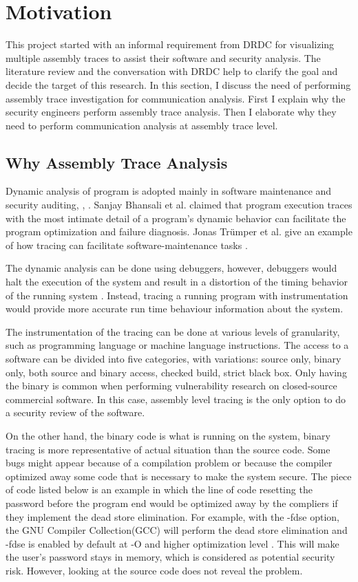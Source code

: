 \section{Motivation}
This project started with an informal requirement from DRDC for visualizing multiple assembly traces to assist their software and security analysis. The literature review and the conversation with DRDC help to clarify the goal and decide the target of this research. In this section, I discuss the need of performing assembly trace investigation for communication analysis. First I explain why the security engineers perform assembly trace analysis. Then I elaborate why they need to perform communication analysis at assembly trace level. 

\subsection{Why Assembly Trace Analysis}
Dynamic analysis of program is adopted mainly in software maintenance and security auditing\cite{zhang2010detecting}, \cite{cai2016sworddta}, \cite{somorovsky2016systematic}. Sanjay Bhansali et al. claimed that program execution traces with the most intimate detail of a program's dynamic behavior can facilitate the program optimization and failure diagnosis. Jonas Tr{\"u}mper et al. give an example of how tracing can facilitate software-maintenance tasks \cite{trumper2012maintenance}.

The dynamic analysis can be done using debuggers, however, debuggers would halt the execution of the system and result in a distortion of the timing behavior of the running system \cite{trumper2012maintenance}. Instead, tracing a running program with instrumentation would provide more accurate run time behaviour information about the system. 

The instrumentation of the tracing can be done at various levels of granularity, such as programming language or machine language instructions. The access to a software can be divided into five categories, with variations: source only, binary only, both source and binary access, checked build, strict black box. Only having the binary is common when performing vulnerability research on closed-source commercial software\cite{dowd_art_2006}. In this case, assembly level tracing is the only option to do a security review of the software.

On the other hand, the binary code is what is running on the system, binary tracing is more representative of actual situation than the source code. Some bugs might appear because of a compilation problem or because the compiler optimized away some code that is necessary to make the system secure. The piece of code listed below is an example in which the line of code resetting the password before the program end would be optimized away by the compliers if they implement the dead store elimination\cite{howard2003writing}. For example, with the -fdse option, the GNU Compiler Collection(GCC) will perform the dead store elimination and -fdse is enabled by default at -O and higher optimization level \cite{gcc}. This will make the user's password stays in memory, which is considered as potential security risk. However, looking at the source code does not reveal the problem.

